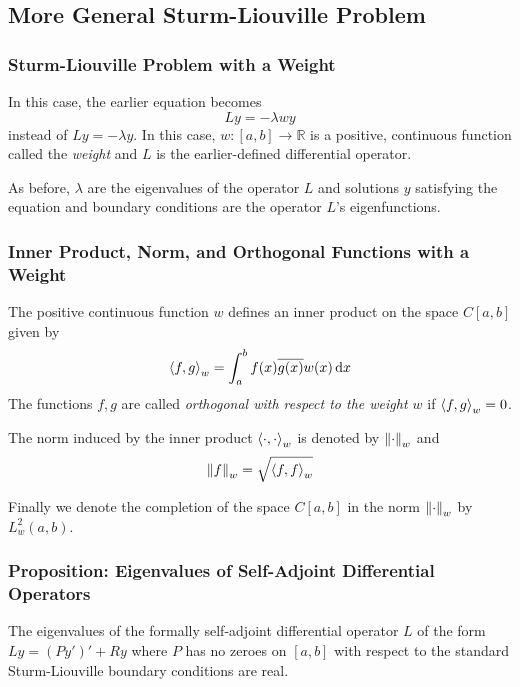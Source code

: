 \documentclass[11pt, a4paper]{article}
\newcommand{\diff}{\mathop{}\!\mathrm{d}} %
\newcommand{\R}{\mathbb{R}} %
\begin{document}
\subsection{More General Sturm-Liouville Problem}

\subsubsection{Sturm-Liouville Problem with a Weight}
In this case, the earlier equation becomes
\begin{equation*}
	Ly = -\lambda w y
\end{equation*}
instead of $ Ly = -\lambda y $. In this case, $ w:[a, b] \to \R $ is a positive, continuous function called the \textit{weight} and $ L $ is the earlier-defined differential operator.

As before, $ \lambda $ are the eigenvalues of the operator $ L $ and solutions $ y $ satisfying the equation and boundary conditions are the operator $ L $'s eigenfunctions.

\subsubsection{Inner Product, Norm, and Orthogonal Functions with a Weight}
The positive continuous function $ w $ defines an inner product on the space $ C[a, b] $ given by
\begin{equation*}
	\expval{f, g}_{w} = \int_{a}^{b} f(x)\overline{g(x)} w(x) \diff x
\end{equation*}
The functions $ f, g $ are called \textit{orthogonal with respect to the weight $ w $} if $ \expval{f, g}_{w} = 0 $.

The norm induced by the inner product $ \expval{\cdot, \cdot}_{w} $ is denoted by $ \norm{\cdot}_{w} $ and
\begin{equation*}
	\norm{f}_{w} = \sqrt{\expval{f, f}_{w}}
\end{equation*}

Finally we denote the completion of the space $ C[a, b] $ in the norm $ \norm{\cdot}_{w} $  by $ L_{w}^{2}(a, b) $.


\subsubsection{Proposition: Eigenvalues of Self-Adjoint Differential Operators}
The eigenvalues of the formally self-adjoint differential operator $ L $ of the form $ Ly = (Py')' + Ry $ where $ P $ has no zeroes on $ [a, b] $ with respect to the standard Sturm-Liouville boundary conditions are real. 
\end{document}
